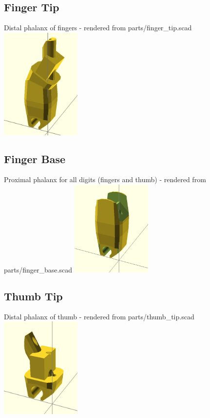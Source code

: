 \documentclass[11pt]{article}
\begin{document}
\hypertarget{thing_finger\_tip}{\subsection{Finger Tip}}
Distal phalanx of fingers - rendered from parts/finger\_tip.scad
\includegraphics[width=4cm]{images/finger_tip.png}

\hypertarget{thing_finger\_base}{\subsection{Finger Base}}
Proximal phalanx for all digits (fingers and thumb) - rendered from parts/finger\_base.scad
\includegraphics[width=4cm]{images/finger_base.png}

\hypertarget{thing_thumb\_tip}{\subsection{Thumb Tip}}
Distal phalanx of thumb - rendered from parts/thumb\_tip.scad
\includegraphics[width=4cm]{images/thumb_tip.png}
\end{document}
